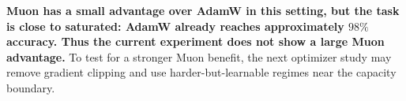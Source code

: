 \documentclass[11pt]{article}
\begin{document}
\textbf{Muon has a small advantage over AdamW in this setting, but the task is close to saturated:
AdamW already reaches approximately \(98\%\) accuracy.
Thus the current experiment does not show a large Muon advantage.}
To test for a stronger Muon benefit, the next optimizer study may remove gradient clipping and use harder-but-learnable regimes near the capacity boundary.
\end{document}

